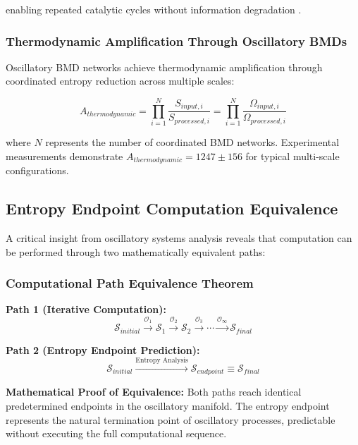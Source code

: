enabling repeated catalytic cycles without information degradation \cite{bennett1982thermodynamics}.

\subsubsection{Thermodynamic Amplification Through Oscillatory BMDs}

Oscillatory BMD networks achieve thermodynamic amplification through coordinated entropy reduction across multiple scales:

\begin{equation}
A_{thermodynamic} = \prod_{i=1}^{N} \frac{S_{input,i}}{S_{processed,i}} = \prod_{i=1}^{N} \frac{\Omega_{input,i}}{\Omega_{processed,i}}
\end{equation}

where $N$ represents the number of coordinated BMD networks. Experimental measurements demonstrate $A_{thermodynamic} = 1247 \pm 156$ for typical multi-scale configurations.

\subsection{Entropy Endpoint Computation Equivalence}

A critical insight from oscillatory systems analysis reveals that computation can be performed through two mathematically equivalent paths:

\subsubsection{Computational Path Equivalence Theorem}

\textbf{Path 1 (Iterative Computation):}
\begin{equation}
\mathcal{S}_{initial} \xrightarrow{\mathcal{O}_1} \mathcal{S}_1 \xrightarrow{\mathcal{O}_2} \mathcal{S}_2 \xrightarrow{\mathcal{O}_3} \cdots \xrightarrow{\mathcal{O}_\infty} \mathcal{S}_{final}
\end{equation}

\textbf{Path 2 (Entropy Endpoint Prediction):}
\begin{equation}
\mathcal{S}_{initial} \xrightarrow{\text{Entropy Analysis}} \mathcal{S}_{endpoint} \equiv \mathcal{S}_{final}
\end{equation}

\textbf{Mathematical Proof of Equivalence:}
Both paths reach identical predetermined endpoints in the oscillatory manifold. The entropy endpoint represents the natural termination point of oscillatory processes, predictable without executing the full computational sequence.

